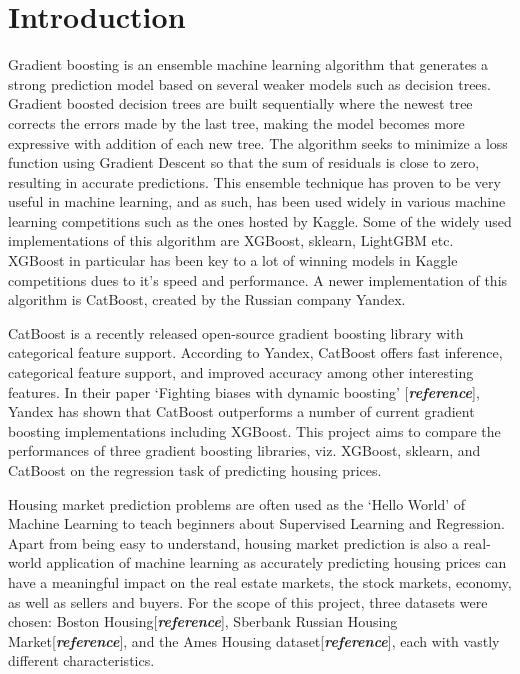 \section{Introduction}
\label{sec:introduction}

Gradient boosting is an ensemble machine learning algorithm that generates a strong prediction model based on several weaker models such as decision trees. Gradient boosted decision trees are built sequentially where the newest tree corrects the errors made by the last tree, making the model becomes more expressive with addition of each new tree. The algorithm seeks to minimize a loss function using Gradient Descent so that the sum of residuals is close to zero, resulting in accurate predictions. This ensemble technique has proven to be very useful in machine learning, and as such, has been used widely in various machine learning competitions such as the ones hosted by Kaggle. Some of the widely used implementations of this algorithm are XGBoost, sklearn, LightGBM etc. XGBoost in particular has been key to a lot of winning models in Kaggle competitions dues to it's speed and performance. A newer implementation of this algorithm is CatBoost, created by the Russian company Yandex.

CatBoost is a recently released open-source gradient boosting library with categorical feature support. According to Yandex, CatBoost offers fast inference, categorical feature support, and improved accuracy among other interesting features. In their paper ‘Fighting biases with dynamic boosting’ [\textbf{\textit{reference}}], Yandex has shown that CatBoost outperforms a number of current gradient boosting implementations including XGBoost. This project aims to compare the performances of three gradient boosting libraries, viz. XGBoost, sklearn, and CatBoost on the regression task of predicting housing prices. 
 
Housing market prediction problems are often used as the ‘Hello World’ of Machine Learning to teach beginners about Supervised Learning and Regression. Apart from being easy to understand, housing market prediction is also a real-world application of machine learning as accurately predicting housing prices can have a meaningful impact on the real estate markets, the stock markets, economy, as well as sellers and buyers. For the scope of this project, three datasets were chosen: Boston Housing[\textbf{\textit{reference}}], Sberbank Russian Housing Market[\textbf{\textit{reference}}], and the Ames Housing dataset[\textbf{\textit{reference}}], each with vastly different characteristics.

